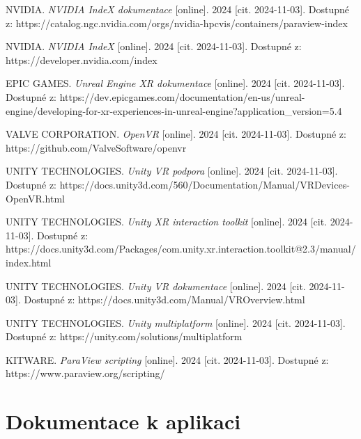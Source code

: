 \documentclass[a4paper,oneside,12pt]{book}
\begin{document}
\begin{thebibliography}{99}
NVIDIA. \textit{NVIDIA IndeX dokumentace} [online]. 2024 [cit. 2024-11-03]. Dostupné z: https://catalog.ngc.nvidia.com/orgs/nvidia-hpcvis/containers/paraview-index

NVIDIA. \textit{NVIDIA IndeX} [online]. 2024 [cit. 2024-11-03]. Dostupné z: https://developer.nvidia.com/index

EPIC GAMES. \textit{Unreal Engine XR dokumentace} [online]. 2024 [cit. 2024-11-03]. Dostupné z: https://dev.epicgames.com/documentation/en-us/unreal-engine/developing-for-xr-experiences-in-unreal-engine?application\_version=5.4

VALVE CORPORATION. \textit{OpenVR} [online]. 2024 [cit. 2024-11-03]. Dostupné z: https://github.com/ValveSoftware/openvr


UNITY TECHNOLOGIES. \textit{Unity VR podpora} [online]. 2024 [cit. 2024-11-03]. Dostupné z: https://docs.unity3d.com/560/Documentation/Manual/VRDevices-OpenVR.html


UNITY TECHNOLOGIES. \textit{Unity XR interaction toolkit} [online]. 2024 [cit. 2024-11-03]. Dostupné z: https://docs.unity3d.com/Packages/com.unity.xr.interaction.toolkit@2.3/manual/index.html

UNITY TECHNOLOGIES. \textit{Unity VR dokumentace} [online]. 2024 [cit. 2024-11-03]. Dostupné z: https://docs.unity3d.com/Manual/VROverview.html

UNITY TECHNOLOGIES. \textit{Unity multiplatform} [online]. 2024 [cit. 2024-11-03]. Dostupné z: https://unity.com/solutions/multiplatform

KITWARE. \textit{ParaView scripting} [online]. 2024 [cit. 2024-11-03]. Dostupné z: https://www.paraview.org/scripting/
\end{thebibliography}


\newpage %
\appendix %


\chapter{Dokumentace k aplikaci} %
%
\end{document}
